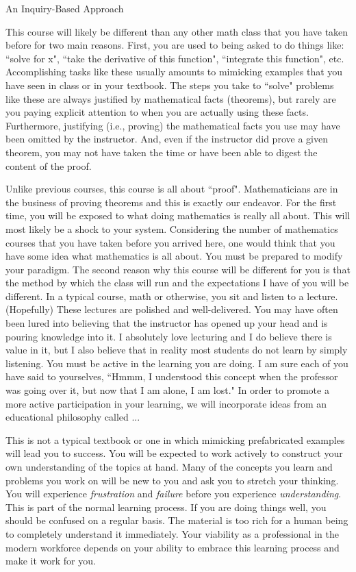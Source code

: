 \begin{section}{An Inquiry-Based Approach}


This course will likely be different than any other math class that you have taken before for two main reasons. First, you are used to being asked to do things like: ``solve for x", ``take the derivative of this function", ``integrate this function", etc. Accomplishing tasks like these usually amounts to mimicking examples that you have seen in class or in your textbook. The steps you take to ``solve" problems like these are always justified by mathematical facts (theorems), but rarely are you paying explicit attention to when you are actually using these facts. Furthermore, justifying (i.e., proving) the mathematical facts you use may have been omitted by the instructor. And, even if the instructor did prove a given theorem, you may not have taken the time or have been able to digest the content of the proof.

Unlike previous courses, this course is all about ``proof". Mathematicians are in the business of proving theorems and this is exactly our endeavor. For the first time, you will be exposed to what doing mathematics is really all about. This will most likely be a shock to your system. Considering the number of mathematics courses that you have taken before you arrived here, one would think that you have some idea what mathematics is all about. You must be prepared to modify your paradigm. The second reason why this course will be different for you is that the method by which the class will run and the expectations I have of you will be different. In a typical course, math or otherwise, you sit and listen to a lecture. (Hopefully) These lectures are polished and well-delivered. You may have often been lured into believing that the instructor has opened up your head and is pouring knowledge into it. I absolutely love lecturing and I do believe there is value in it, but I also believe that in reality most students do not learn by simply listening. You must be active in the learning you are doing. I am sure each of you have said to yourselves, ``Hmmm, I understood this concept when the professor was going over it, but now that I am alone, I am lost." In order to promote a more active participation in your learning, we will incorporate ideas from an educational philosophy called ...


This is not a typical textbook or one in which mimicking prefabricated examples will lead you to success. You will be expected to work actively to construct your own understanding of the topics at hand. Many of the concepts you learn and problems you work on will be new to you and ask you to stretch your thinking. You will experience \emph{frustration} and \emph{failure} before you experience \emph{understanding}. This is part of the normal learning process. If you are doing things well, you should be confused on a regular basis. The material is too rich for a human being to completely understand it immediately. Your viability as a professional in the modern workforce depends on your ability to embrace this learning process and make it work for you.


\end{section}
